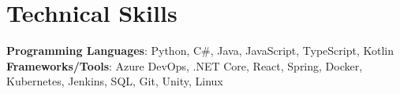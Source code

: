 \section{Technical Skills}
 \begin{itemize}[leftmargin=0.15in, label={}]
    \small{\item{
      \textbf{Programming Languages}{: Python, C\#, Java, JavaScript, TypeScript, Kotlin } \\
     \textbf{Frameworks/Tools}{: Azure DevOps, .NET Core, React, Spring, Docker, Kubernetes, Jenkins, SQL, Git, Unity, Linux }\\
    }}
 \end{itemize}